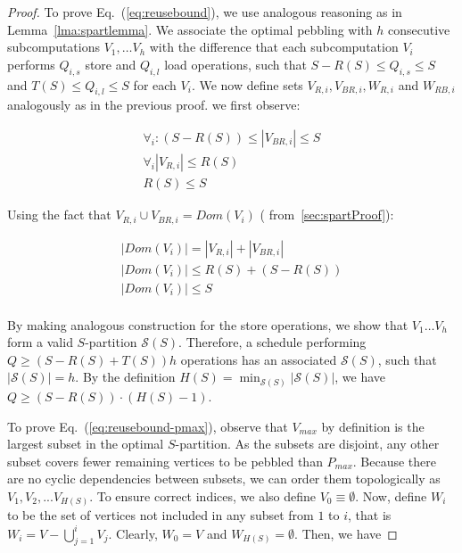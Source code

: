 \documentclass[sigplan,review,anonymous]{acmart}\settopmatter{printfolios=true,printccs=false,printacmref=false}
\begin{document}
\begin{proof}
	To prove Eq.~(\ref{eq:reusebound}), we use analogous 
	reasoning as in Lemma~\ref{lma:spartlemma}. We associate 
	the optimal pebbling with $h$ consecutive subcomputations 
	$V_1, \dots V_h$ with the difference that each 
	subcomputation $V_i$ performs $Q_{i,s}$ store and $Q_{i,l}$ load 
	operations, such that $S-R(S) \le Q_{i,s} \le S$ and $T(S) \le Q_{i,l} \le 
	S$ for each $V_i$. We now define sets $V_{R,i}, V_{BR,i}, W_{R,i}$ and 
	$W_{RB,i}$ analogously as in the previous proof. we first observe:
	
	\vspace{-0.5em}
	\begin{gather}
	\nonumber
	\forall_{i}: (S - R(S)) \le |V_{BR,i}| \le S \\
	\nonumber
	\forall_{i}|V_{R,i}| \le R(S) \\
	\nonumber
	R(S) \le S 
	\end{gather}
	\vspace{-0.5em}
	
	Using the fact that $V_{R,i} \cup V_{BR,i} = Dom(V_i)$ 
	( from~\cref{sec:spartProof}):
	
	\vspace{-0.5em}
	\begin{gather}
	\label{eq:proof}
	\nonumber
	|Dom(V_i)| = |V_{R,i}| + |V_{BR,i}| \\
	\nonumber
	|Dom(V_i)| \le R(S) + (S - R(S)) \\
	\nonumber
	|Dom(V_i)| \le S \\
	\end{gather}
	\vspace{-0.5em}
	
	By making analogous construction for the store 
	operations, we show that $V_1 \dots V_h$ form a valid 
	$S$-partition $\mathcal{S}(S)$. Therefore, a schedule 
	performing $Q \ge (S - R(S) + T(S)) h$ operations has an 
	associated $\mathcal{S}(S)$, such that $|\mathcal{S}(S)| 
	= h$. By the definition $H(S) = 
	\min_{\mathcal{S}(S)}|\mathcal{S}(S)|$, we have $Q \ge (S 
	- R(S)) \cdot (H(S) - 1)$.
	
	
	To prove Eq.~(\ref{eq:reusebound-pmax}), observe that $V_{max}$ by 
	definition
	is the largest subset in the optimal $S$-partition. As the subsets are
	disjoint, any other subset covers fewer remaining vertices to be pebbled 
	than
	$P_{max}$. Because there are no cyclic dependencies between subsets, we can
	order them topologically as $V_1, V_2, ...V_{H(S)}$. To ensure correct 
	indices,
	we also define $V_0 \equiv \emptyset$. Now, define $W_i$ to be the set
	of vertices not included in any subset from $1$ to $i$, that is $W_i = V -
	\bigcup_{j=1}^{i} V_j$. Clearly, $W_0 = V$ and $W_{H(S)} = \emptyset$. 
	Then, we
	have
	

\end{proof}
\end{document}
